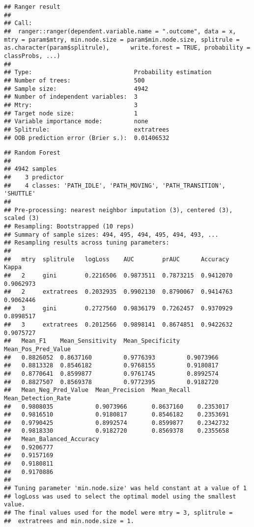 \documentclass[]{article}
\begin{document}
\begin{verbatim}
## Ranger result
## 
## Call:
##  ranger::ranger(dependent.variable.name = ".outcome", data = x,      mtry = param$mtry, min.node.size = param$min.node.size, splitrule = as.character(param$splitrule),      write.forest = TRUE, probability = classProbs, ...) 
## 
## Type:                             Probability estimation 
## Number of trees:                  500 
## Sample size:                      4942 
## Number of independent variables:  3 
## Mtry:                             3 
## Target node size:                 1 
## Variable importance mode:         none 
## Splitrule:                        extratrees 
## OOB prediction error (Brier s.):  0.01406532
\end{verbatim}

\begin{verbatim}
## Random Forest 
## 
## 4942 samples
##    3 predictor
##    4 classes: 'PATH_IDLE', 'PATH_MOVING', 'PATH_TRANSITION', 'SHUTTLE' 
## 
## Pre-processing: nearest neighbor imputation (3), centered (3), scaled (3) 
## Resampling: Bootstrapped (10 reps) 
## Summary of sample sizes: 494, 495, 494, 495, 494, 493, ... 
## Resampling results across tuning parameters:
## 
##   mtry  splitrule   logLoss    AUC        prAUC      Accuracy   Kappa    
##   2     gini        0.2216506  0.9873511  0.7873215  0.9412070  0.9062973
##   2     extratrees  0.2032935  0.9902130  0.8790067  0.9414763  0.9062446
##   3     gini        0.2727560  0.9836179  0.7262457  0.9370929  0.8998517
##   3     extratrees  0.2012566  0.9898141  0.8674851  0.9422632  0.9075727
##   Mean_F1    Mean_Sensitivity  Mean_Specificity  Mean_Pos_Pred_Value
##   0.8826052  0.8637160         0.9776393         0.9073966          
##   0.8813328  0.8546182         0.9768155         0.9180817          
##   0.8770641  0.8599877         0.9761745         0.8992574          
##   0.8827507  0.8569378         0.9772395         0.9182720          
##   Mean_Neg_Pred_Value  Mean_Precision  Mean_Recall  Mean_Detection_Rate
##   0.9808035            0.9073966       0.8637160    0.2353017          
##   0.9816510            0.9180817       0.8546182    0.2353691          
##   0.9790425            0.8992574       0.8599877    0.2342732          
##   0.9818330            0.9182720       0.8569378    0.2355658          
##   Mean_Balanced_Accuracy
##   0.9206777             
##   0.9157169             
##   0.9180811             
##   0.9170886             
## 
## Tuning parameter 'min.node.size' was held constant at a value of 1
## logLoss was used to select the optimal model using the smallest value.
## The final values used for the model were mtry = 3, splitrule =
##  extratrees and min.node.size = 1.
\end{verbatim}
\end{document}
